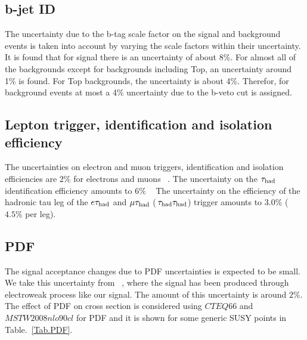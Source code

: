 \subsection{b-jet ID}
The uncertainty due to the b-tag scale factor on the signal and background events is taken into account by varying the scale factors within their 
uncertainty. It is found that for signal there is an uncertainty of about $8\%$. For almost all of the backgrounds except for backgrounds including Top, an uncertainty around 1\% is found. For Top backgrounds, the uncertainty is about 4\%. Therefor, for background events at most a 4\% uncertainty due to the b-veto cut is assigned. 
 
\subsection{Lepton trigger, identification and isolation efficiency}
The uncertainties on electron and muon triggers, identification and isolation efficiencies are $2\%$ for electrons and muons ~\cite{CMS_AN_2013-171}. The uncertainty on the $\tau_{\rm had}$ identification efficiency amounts to $6\%$ ~\cite{CMS_AN_2013-171}
The uncertainty on the efficiency of the hadronic tau leg of the $e\tau_{\rm had}$ and $\mu\tau_{\rm had}$ ($\,\tau_{\rm had}\tau_{\rm had}$) trigger amounts to $3.0\%$ ($4.5\%$ per leg).

\subsection{PDF}
The signal acceptance changes due to PDF uncertainties is expected to be small. We take this uncertainty from ~\cite{CMS_AN_2012-248}, where the signal has been produced through electroweak process like our signal. The amount of this uncertainty is around $2\%$.
The effect of PDF on cross section is considered using $CTEQ66$ and $MSTW2008nlo90cl$ for PDF and it is shown for some generic SUSY points in Table.~\ref{Tab.PDF}.


